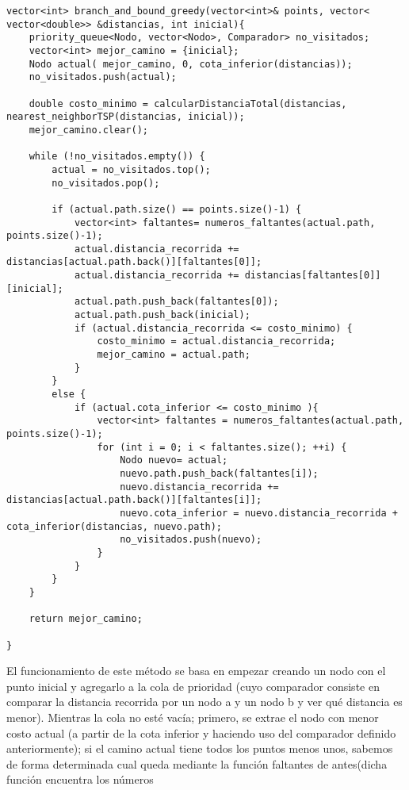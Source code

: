 \documentclass[11pt,openany]{book}
\begin{document}
\begin{lstlisting}
vector<int> branch_and_bound_greedy(vector<int>& points, vector< vector<double>> &distancias, int inicial){
    priority_queue<Nodo, vector<Nodo>, Comparador> no_visitados;
    vector<int> mejor_camino = {inicial};
    Nodo actual( mejor_camino, 0, cota_inferior(distancias));
    no_visitados.push(actual);

    double costo_minimo = calcularDistanciaTotal(distancias, nearest_neighborTSP(distancias, inicial));
    mejor_camino.clear();

    while (!no_visitados.empty()) {
        actual = no_visitados.top();
        no_visitados.pop();

        if (actual.path.size() == points.size()-1) {
            vector<int> faltantes= numeros_faltantes(actual.path, points.size()-1);
            actual.distancia_recorrida += distancias[actual.path.back()][faltantes[0]];
            actual.distancia_recorrida += distancias[faltantes[0]][inicial];
            actual.path.push_back(faltantes[0]);
            actual.path.push_back(inicial);
            if (actual.distancia_recorrida <= costo_minimo) {
                costo_minimo = actual.distancia_recorrida;
                mejor_camino = actual.path;
            }
        } 
        else { 
            if (actual.cota_inferior <= costo_minimo ){
                vector<int> faltantes = numeros_faltantes(actual.path, points.size()-1);
                for (int i = 0; i < faltantes.size(); ++i) {
                    Nodo nuevo= actual;
                    nuevo.path.push_back(faltantes[i]);
                    nuevo.distancia_recorrida += distancias[actual.path.back()][faltantes[i]];
                    nuevo.cota_inferior = nuevo.distancia_recorrida + cota_inferior(distancias, nuevo.path);
                    no_visitados.push(nuevo);
                }
            }
        }
    }

    return mejor_camino;

}
\end{lstlisting}
El funcionamiento de este método se basa en empezar creando un nodo con el punto inicial y agregarlo a la cola de prioridad (cuyo comparador
consiste en comparar la distancia recorrida por un nodo a y un nodo b y ver qué distancia es menor). Mientras la cola no esté vacía; primero,
se extrae el nodo con menor costo actual (a partir de la cota inferior y haciendo uso del comparador definido anteriormente); si el camino actual 
tiene todos los puntos menos unos, sabemos de forma determinada cual queda mediante la función faltantes de antes(dicha función encuentra los números
\end{document}

